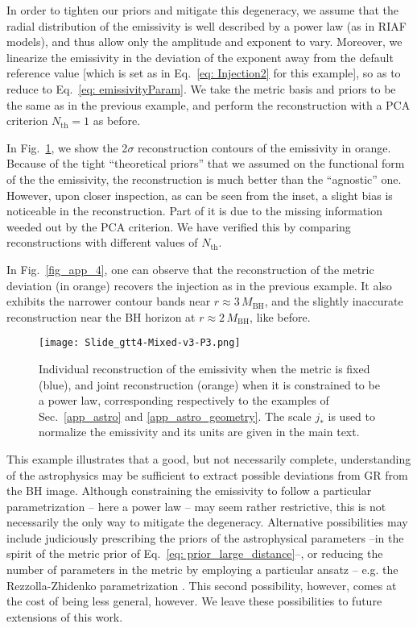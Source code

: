 \documentclass[%
nofootinbib,
 amsmath,amssymb,
 aps,
floatfix,
twocolumn
]{revtex4-2}
\begin{document}
In order to tighten our priors and mitigate this degeneracy, we assume that the radial distribution of the emissivity is well described by a power law (as in RIAF models), and thus allow only the amplitude and exponent to vary. Moreover, we linearize the emissivity in the deviation of the exponent away from the default reference value [which is set as in Eq.~\eqref{eq: Injection2} for this example], so as to reduce to Eq.~\eqref{eq: emissivityParam}. 
We take the metric basis and priors to be the same as in the previous example, 
and perform the reconstruction with a PCA criterion \(N_\text{th} = 1\) as before. 

In Fig.~\ref{fig_app_3}, we show the 2\(\sigma\) reconstruction contours of the emissivity in orange. 
Because of the tight ``theoretical priors'' that we
assumed on the functional form of the
the emissivity, the
reconstruction is much better than the ``agnostic'' one. 
However, upon closer inspection, as can be seen from the inset, a slight bias is noticeable in the reconstruction. Part of it is due to the missing information weeded out by the PCA criterion.
We have verified this by comparing reconstructions with different values of \(N_\text{th}\). 

In Fig.~\ref{fig_app_4}, one can observe that the reconstruction of the metric deviation (in orange) recovers the injection as in the previous example. It also exhibits the narrower contour bands near \(r \approx 3 \, M_\text{BH}\), and the slightly inaccurate reconstruction near the BH horizon at \( r \approx 2 \, M_\text{BH}\), like before.

\begin{figure}[]
\centering
\texttt{[image: Slide\_gtt4-Mixed-v3-P3.png]}
\caption{Individual reconstruction of the emissivity
when the metric is fixed (blue), and joint reconstruction (orange) when it is constrained to be a power law, corresponding respectively to the examples of Sec.~\ref{app_astro} and \ref{app_astro_geometry}. The scale \(j_{*}\) is used to normalize the emissivity and its units are given in the main text. } \label{fig_app_3}
\end{figure} 



This example illustrates that a good, but not necessarily complete, understanding of the astrophysics may be sufficient to extract possible deviations from GR from the BH image. Although constraining the emissivity to follow a particular parametrization -- here a power law -- may seem rather restrictive, this is not necessarily the only way to mitigate the degeneracy. 
Alternative possibilities may include judiciously prescribing the priors of the astrophysical parameters --in the spirit of the metric prior of Eq.~\eqref{eq: prior_large_distance}--, or reducing the number of parameters in the metric by employing a particular ansatz -- e.g. the Rezzolla-Zhidenko parametrization \cite{PhysRevD.90.084009}. 
This second possibility, however, comes at the cost of being less general, however. We leave these possibilities to future extensions of this work. 
\end{document}
